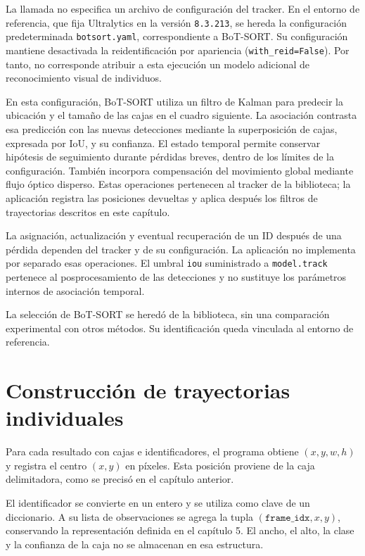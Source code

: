 La llamada no especifica un archivo de configuración del tracker. En el entorno de referencia, que fija Ultralytics en la versión \texttt{8.3.213}, se hereda la configuración predeterminada \texttt{botsort.yaml}, correspondiente a BoT-SORT. Su configuración mantiene desactivada la reidentificación por apariencia (\texttt{with\_reid=False}). Por tanto, no corresponde atribuir a esta ejecución un modelo adicional de reconocimiento visual de individuos.

En esta configuración, BoT-SORT utiliza un filtro de Kalman para predecir la ubicación y el tamaño de las cajas en el cuadro siguiente. La asociación contrasta esa predicción con las nuevas detecciones mediante la superposición de cajas, expresada por IoU, y su confianza. El estado temporal permite conservar hipótesis de seguimiento durante pérdidas breves, dentro de los límites de la configuración. También incorpora compensación del movimiento global mediante flujo óptico disperso. Estas operaciones pertenecen al tracker de la biblioteca; la aplicación registra las posiciones devueltas y aplica después los filtros de trayectorias descritos en este capítulo.

La asignación, actualización y eventual recuperación de un ID después de una pérdida dependen del tracker y de su configuración. La aplicación no implementa por separado esas operaciones. El umbral \texttt{iou} suministrado a \texttt{model.track} pertenece al posprocesamiento de las detecciones y no sustituye los parámetros internos de asociación temporal.

La selección de BoT-SORT se heredó de la biblioteca, sin una comparación experimental con otros métodos. Su identificación queda vinculada al entorno de referencia.

\section{Construcción de trayectorias individuales}

Para cada resultado con cajas e identificadores, el programa obtiene $(x,y,w,h)$ y registra el centro $(x,y)$ en píxeles. Esta posición proviene de la caja delimitadora, como se precisó en el capítulo anterior.

El identificador se convierte en un entero y se utiliza como clave de un diccionario. A su lista de observaciones se agrega la tupla $(\texttt{frame\_idx},x,y)$, conservando la representación definida en el capítulo 5. El ancho, el alto, la clase y la confianza de la caja no se almacenan en esa estructura.

